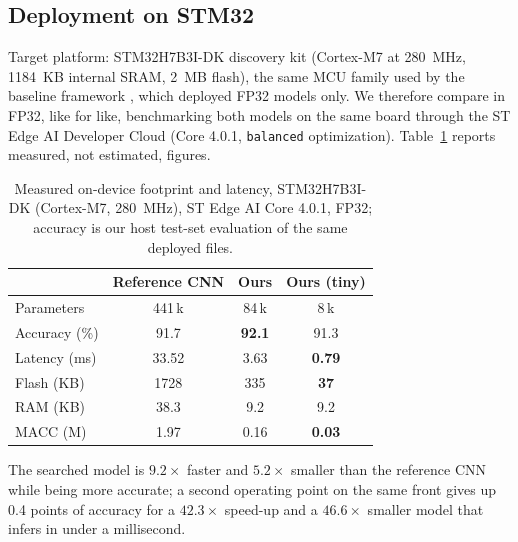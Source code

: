 \documentclass[journal]{IEEEtran}
\begin{document}
\subsection{Deployment on STM32}
Target platform: STM32H7B3I-DK discovery kit (Cortex-M7 at 280~MHz, 1184~KB
internal SRAM, 2~MB flash), the same MCU family used by the baseline framework
\cite{lcintention2026}, which deployed FP32 models only. We therefore compare in
FP32, like for like, benchmarking both models on the same board through the ST
Edge AI Developer Cloud (Core 4.0.1, \texttt{balanced} optimization).
Table~\ref{tab:deploy} reports measured, not estimated, figures.

\begin{table}[t]
\caption{Measured on-device footprint and latency, STM32H7B3I-DK (Cortex-M7,
280~MHz), ST Edge AI Core 4.0.1, FP32; accuracy is our host test-set evaluation
of the same deployed files.}
\label{tab:deploy}
\centering
\begin{tabular}{lccc}
\toprule
 & Reference CNN & Ours & Ours (tiny) \\
\midrule
Parameters      & 441\,k & 84\,k & 8\,k \\
Accuracy (\%)   & 91.7  & \textbf{92.1} & 91.3 \\
Latency (ms)    & 33.52 & 3.63 & \textbf{0.79} \\
Flash (KB)      & 1728  & 335  & \textbf{37} \\
RAM (KB)        & 38.3  & 9.2  & 9.2 \\
MACC (M)        & 1.97  & 0.16 & \textbf{0.03} \\
\bottomrule
\end{tabular}
\end{table}

The searched model is $9.2\times$ faster and $5.2\times$ smaller than the
reference CNN while being more accurate; a second operating point on the same
front gives up 0.4 points of accuracy for a $42.3\times$ speed-up and a
$46.6\times$ smaller model that infers in under a millisecond.
\end{document}
